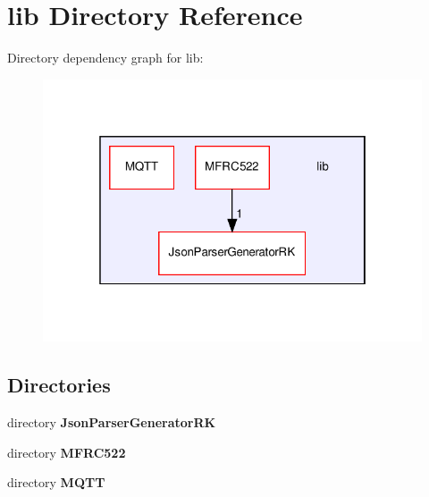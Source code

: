 \section{lib Directory Reference}
\label{dir_97aefd0d527b934f1d99a682da8fe6a9}
Directory dependency graph for lib\+:\nopagebreak
\begin{figure}[H]
\begin{center}
\leavevmode
\includegraphics[width=318pt]{dir_97aefd0d527b934f1d99a682da8fe6a9_dep}
\end{center}
\end{figure}
\subsection*{Directories}
\begin{DoxyCompactItemize}
\item 
directory \textbf{ Json\+Parser\+Generator\+RK}
\item 
directory \textbf{ M\+F\+R\+C522}
\item 
directory \textbf{ M\+Q\+TT}
\end{DoxyCompactItemize}
